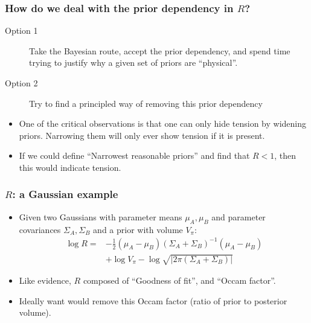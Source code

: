 \documentclass[aspectratio=169, handout]{beamer}
\begin{document}
\begin{frame}
    \frametitle{How do we deal with the prior dependency in $R$?}
    \begin{description}
        \item[Option 1] Take the Bayesian route, accept the prior dependency, and spend time trying to justify why a given set of priors are ``physical''.
        \item[Option 2] Try to find a principled way of removing this prior dependency
    \end{description}
    \begin{itemize}
        \item One of the critical observations is that one can only hide tension by widening priors. Narrowing them will only ever show tension if it is present.
        \item If we could define ``Narrowest reasonable priors'' and find that $R<1$, then this would indicate tension.
    \end{itemize}
\end{frame}

\begin{frame}
    \frametitle{$R$: a Gaussian example}
    \begin{itemize}
        \item Given two Gaussians with parameter means $\mu_A,\mu_B$ and parameter covariances $\Sigma_A,\Sigma_B$ and a prior with volume $V_\pi$:
            \begin{align}
                \log R =& -\frac{1}{2} (\mu_A-\mu_B){(\Sigma_{A}+\Sigma_{B})}^{-1}(\mu_A-\mu_B)\nonumber\\
                & + \log V_\pi\nonumber -\log\sqrt{|2\pi(\Sigma_{A}+\Sigma_{B})|} 
            \end{align}
        \item Like evidence, $R$ composed of ``Goodness of fit'', and ``Occam factor''.
        \item Ideally want would remove this Occam factor (ratio of prior to posterior volume).
    \end{itemize}
\end{frame}
\end{document}
